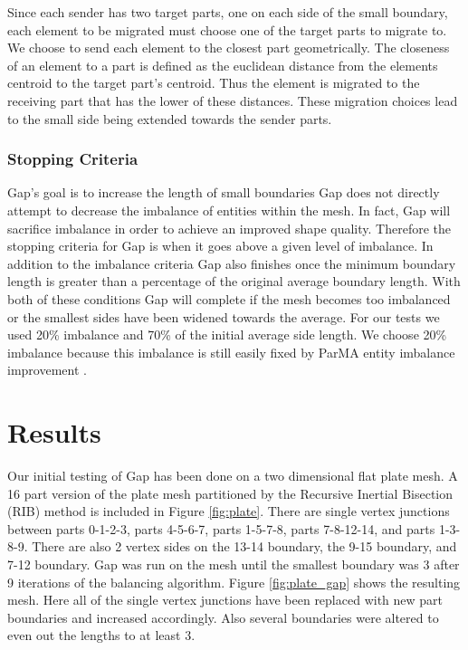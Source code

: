 \documentclass{thesis}
\begin{document}
Since each sender has two target parts, one on each side of the small 
boundary, each element to be migrated must choose one of the target parts to 
migrate to. We choose to send each element to the closest part geometrically. 
The closeness of an element to a part is defined as the euclidean distance 
from the elements centroid to the target part's centroid. Thus the element 
is migrated to the receiving part that has the lower of these distances. 
These migration choices lead to the small side being extended towards the 
sender parts. 


\subsection{Stopping Criteria}
Gap's goal is to increase the length of small boundaries
Gap does not directly attempt to decrease the imbalance of entities within 
the mesh. In fact, Gap will sacrifice imbalance in order to achieve an improved 
shape quality. Therefore the stopping criteria for Gap is when it goes above a 
given level of imbalance. In addition to the imbalance criteria Gap also 
finishes once the minimum boundary length is greater than a percentage of the 
original average boundary length. With both of these conditions Gap will 
complete if the mesh becomes too imbalanced or the smallest sides have been 
widened towards the average. For our tests we used 20\% imbalance and 70\% 
of the initial average side length. We choose 20\% imbalance because this 
imbalance is still easily fixed by ParMA entity imbalance improvement 
\cite{parma,zhougraph,zhou2012}.

\chapter{Results}

Our initial testing of Gap has been done on a two dimensional flat plate mesh. 
A 16 part version of the plate mesh partitioned by  the Recursive Inertial 
Bisection (RIB) method \cite{williamsRIB,taylorRIB} is included in Figure 
\ref{fig:plate}. There are single vertex junctions between parts 0-1-2-3, 
parts 4-5-6-7, parts 1-5-7-8, parts 7-8-12-14, and parts 1-3-8-9. There are 
also 2 vertex sides on the 13-14 boundary, the 9-15 boundary, and 7-12 
boundary. Gap was run on the mesh until the smallest boundary was 3 after 9 
iterations of the balancing algorithm. Figure \ref{fig:plate_gap} shows the 
resulting mesh. Here all of the single vertex junctions have been replaced with 
new part boundaries and increased accordingly. Also several boundaries were 
altered to even out the lengths to at least 3. 
\end{document}

